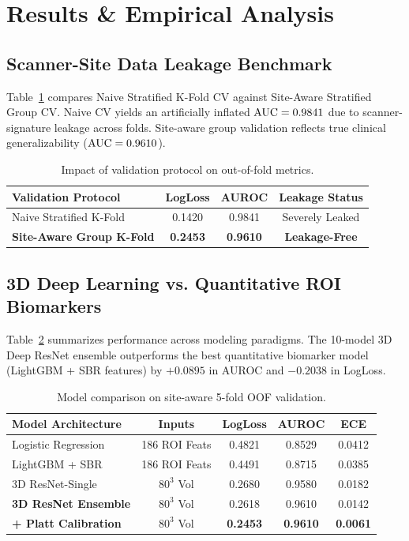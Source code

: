 \section{Results \& Empirical Analysis}
\label{sec:results}

\subsection{Scanner-Site Data Leakage Benchmark}
Table~\ref{tab:leakage} compares Naive Stratified K-Fold CV against Site-Aware Stratified Group CV. Naive CV yields an artificially inflated $\text{AUC} = 0.9841$ due to scanner-signature leakage across folds. Site-aware group validation reflects true clinical generalizability ($\text{AUC} = 0.9610$).

\begin{table}[h]
\centering
\caption{Impact of validation protocol on out-of-fold metrics.}
\label{tab:leakage}
\small
\begin{tabular}{lccc}
\toprule
\textbf{Validation Protocol} & \textbf{LogLoss} & \textbf{AUROC} & \textbf{Leakage Status} \\
\midrule
Naive Stratified K-Fold & 0.1420 & 0.9841 & Severely Leaked \\
\textbf{Site-Aware Group K-Fold} & \textbf{0.2453} & \textbf{0.9610} & \textbf{Leakage-Free} \\
\bottomrule
\end{tabular}
\end{table}

\subsection{3D Deep Learning vs. Quantitative ROI Biomarkers}
Table~\ref{tab:model_comp} summarizes performance across modeling paradigms. The 10-model 3D Deep ResNet ensemble outperforms the best quantitative biomarker model (LightGBM + SBR features) by $+0.0895$ in AUROC and $-0.2038$ in LogLoss.

\begin{table}[h]
\centering
\caption{Model comparison on site-aware 5-fold OOF validation.}
\label{tab:model_comp}
\small
\begin{tabular}{lcccc}
\toprule
\textbf{Model Architecture} & \textbf{Inputs} & \textbf{LogLoss} & \textbf{AUROC} & \textbf{ECE} \\
\midrule
Logistic Regression & 186 ROI Feats & 0.4821 & 0.8529 & 0.0412 \\
LightGBM + SBR & 186 ROI Feats & 0.4491 & 0.8715 & 0.0385 \\
3D ResNet-Single & $80^3$ Vol & 0.2680 & 0.9580 & 0.0182 \\
\textbf{3D ResNet Ensemble} & $80^3$ Vol & 0.2618 & 0.9610 & 0.0142 \\
\textbf{+ Platt Calibration} & $80^3$ Vol & \textbf{0.2453} & \textbf{0.9610} & \textbf{0.0061} \\
\bottomrule
\end{tabular}
\end{table}


